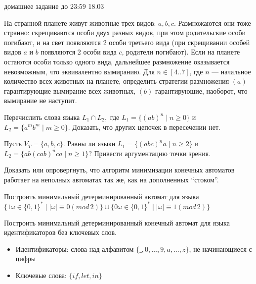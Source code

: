 \documentclass[12pt]{article}
\begin{document}

{\Large домашнее задание до 23:59 18.03}
\bigskip

\enumerate
{
  \item 
  {   
     На странной планете живут животные трех видов: $a, b, c$. Размножаются они тоже странно: скрещиваются особи двух разных видов, при этом родительские особи погибают, и на свет появляются 2 особи третьего вида (при скрещивании особей видов $a$ и $b$ появляются 2 особи вида $c$, родители погибают). Если на планете остаются особи только одного вида, дальнейшее размножение оказывается невозможным, что эквивалентно вымиранию. Для $n \in [4..7]$, где $n$ --- начальное количество всех животных на планете, определить стратегии размножения $(a)$ гарантирующие вымирание всех животных, $(b)$ гарантирующие, наоборот, что вымирание не наступит.
  }
  \item
  {
    Перечислить слова языка $L_1 \cap L_2,$ где $L_1 = \{ (ab)^n \mid n \geq 0 \}$ и $L_2 = \{ a^m b^m \mid m \geq 0 \}$. Доказать, что других цепочек в пересечении нет. 
  }
  \item
  {
    Пусть $V_T = \{a,b,c\}$. Равны ли языки $L_1 = \{ (abc)^n a \mid n \geq 2 \}$ и $L_2 = \{ ab (cab)^n ca \mid n \geq 1 \}$? Привести аргументацию точки зрения. 
  }
  \item
  {
    Доказать или опровергнуть, что алгоритм минимизации конечных автоматов работает на неполных автоматах так же, как на дополненных ``стоком''.
  }
  \item{ Построить минимальный детерминированный автомат для языка \\ $\{1 \omega \in \{ 0, 1\}^* \mid |\omega| \equiv 0 (mod \, 2) \} \cup \{ 0 \omega \in \{ 0, 1\}^* \mid |\omega| \equiv 1(mod \, 2) \}$
}
  \item { Построить минимальный детерминированный конечный автомат для языка идентификаторов без ключевых слов.
  \begin{itemize}
      \item Идентификаторы: слова над алфавитом $\{\_, 0, \dots, 9, a, \dots, z \}$, не начинающиеся с цифры
      \item Ключевые слова: $\{ if, let, in \}$
  \end{itemize}}
}
\end{document}
